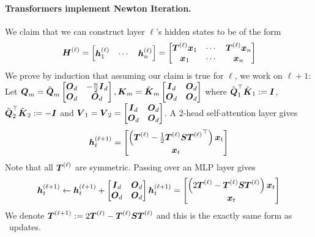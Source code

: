 \paragraph{Transformers implement Newton Iteration.}  We claim that we can construct  layer $\ell$'s hidden states to be of the form 
    \begin{equation}
        \boldsymbol{H}^{(\ell)} = \begin{bmatrix}
            \boldsymbol{h}_1^{(\ell)} & \cdots & \boldsymbol{h}_n^{(\ell)}
        \end{bmatrix} = \begin{bmatrix}
            \boldsymbol{T}^{(\ell)} \boldsymbol{x}_1 & \cdots & \boldsymbol{T}^{(\ell)} \boldsymbol{x}_n \\
            \boldsymbol{x}_1 & \cdots & \boldsymbol{x}_n
        \end{bmatrix} 
    \end{equation}
    We prove by induction that assuming our claim is true for $\ell$, we work on $\ell + 1$:
Let $\boldsymbol{Q}_m = \tilde{\boldsymbol{Q}}_m \begin{bmatrix}
        \boldsymbol{O}_d & -\frac{n}{2} \boldsymbol{I}_d \\
        \boldsymbol{O}_d & \boldsymbol{O}_d 
    \end{bmatrix} , \boldsymbol{K}_m = \tilde{\boldsymbol{K}}_m \begin{bmatrix}
        \boldsymbol{I}_d & \boldsymbol{O}_d \\
        \boldsymbol{O}_d & \boldsymbol{O}_d 
    \end{bmatrix}$ where $\tilde{\boldsymbol{Q}}_1^\top \tilde{\boldsymbol{K}}_1 : = \boldsymbol{I}$, $\tilde{\boldsymbol{Q}}_2^\top \tilde{\boldsymbol{K}}_2 : = -\boldsymbol{I}$ and $\boldsymbol{V}_1 = \boldsymbol{V}_2 = \begin{bmatrix}
        \boldsymbol{I}_d & \boldsymbol{O}_d \\
        \boldsymbol{O}_d & \boldsymbol{O}_d 
    \end{bmatrix}$. A 2-head self-attention layer gives 
\begin{equation}
    \boldsymbol{h}_t^{(\ell+1)} = \begin{bmatrix}
        \left(\boldsymbol{T}^{(\ell)} - \frac{1}{2} \boldsymbol{T}^{(\ell)} \boldsymbol{S} {\boldsymbol{T}^{(\ell)}}^\top \right) \boldsymbol{x}_t \\ \boldsymbol{x}_t 
    \end{bmatrix}
\end{equation}
Note that all $\boldsymbol{T}^{(\ell)}$ are symmetric. Passing over an MLP layer gives
    \begin{equation}
        \boldsymbol{h}_t^{(\ell+1)} \leftarrow \boldsymbol{h}_t^{(\ell+1)} + \begin{bmatrix}
            \boldsymbol{I}_d & \boldsymbol{O}_d \\ 
            \boldsymbol{O}_d & \boldsymbol{O}_d 
        \end{bmatrix} \boldsymbol{h}_t^{(\ell+1)} = \begin{bmatrix}
        \left(2\boldsymbol{T}^{(\ell)} -  \boldsymbol{T}^{(\ell)} \boldsymbol{S} {\boldsymbol{T}^{(\ell)}} \right) \boldsymbol{x}_t \\ \boldsymbol{x}_t 
    \end{bmatrix}
    \end{equation}
We denote $\boldsymbol{T}^{(\ell+1)} := 2\boldsymbol{T}^{(\ell)} -  \boldsymbol{T}^{(\ell)} \boldsymbol{S} {\boldsymbol{T}^{(\ell)}}$ and this is the exactly same form as \newton\ updates. 

